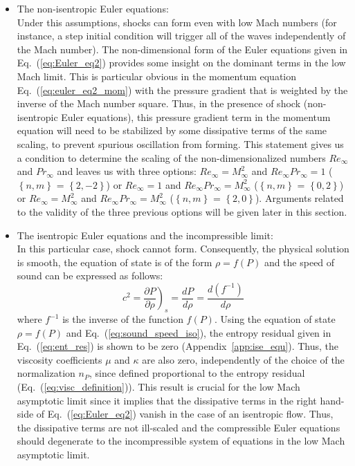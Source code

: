 \documentclass[preprint,10pt]{elsarticle}
\newcommand{\eqt}[1]{Eq.~(\ref{#1})}                     %
\newcommand{\app}[1]{Appendix~\ref{#1}}                   %
\begin{document}
\begin{itemize}
\item The non-isentropic Euler equations:\\
Under this assumptions, shocks can form even with low Mach numbers (for instance, a step initial condition will trigger all of the waves independently of the Mach number). The non-dimensional form of the Euler equations given in \eqt{eq:Euler_eq2} provides some insight on the dominant terms in the low Mach limit. This is particular obvious in the momentum equation \eqt{eq:euler_eq2_mom} with the pressure gradient that is weighted by the inverse of the Mach number square. Thus, in the presence of shock (non-isentropic Euler equations), this pressure gradient term in the momentum equation will need to be stabilized by some dissipative terms of the same scaling, to prevent spurious oscillation from forming. This statement gives us a condition to determine the scaling of the non-dimensionalized numbers $Re_{\infty}$ and $Pr_{\infty}$ and leaves us with three options: $Re_{\infty} = M_{\infty}^2$ and $Re_{\infty}Pr_{\infty} = 1$ ($\left\{ n,m \right\}$ = $\left\{ 2, -2 \right\}$) or $Re_{\infty} = 1$ and $Re_{\infty}Pr_{\infty} = M_{\infty}^2$ ($\left\{ n,m \right\}$ = $\left\{ 0, 2 \right\}$) or $Re_{\infty} = M_{\infty}^2$ and $Re_{\infty}Pr_{\infty} = M_{\infty}^2$ ($\left\{ n,m \right\}$ = $\left\{ 2, 0 \right\}$). Arguments related to the validity of the three previous options will be given later in this section.
\item The isentropic Euler equations and the incompressible limit:\\
In this particular case, shock cannot form. Consequently, the physical solution is smooth, the equation of state is of the form $\rho = f(P)$ and the speed of sound can be expressed as follows: 
\begin{equation}\label{eq:sound_speed_iso}
c^2 = \left. \frac{\partial P}{ \partial \rho}\right)_s = \frac{dP}{d\rho} = \frac{d (f^{-1})}{d \rho} 
\end{equation}
where $f^{-1}$ is the inverse of the function $f(P)$. Using the equation of state $\rho = f(P)$ and \eqt{eq:sound_speed_iso}, the entropy residual given in \eqt{eq:ent_res} is shown to be zero (\app{app:ise_equ}). Thus, the viscosity coefficients $\mu$ and $\kappa$ are also zero, independently of the choice of the normalization $n_P$, since defined proportional to the entropy residual (\eqt{eq:visc_definition}). This result is crucial for the low Mach asymptotic limit since it implies that the dissipative terms in the right hand-side of \eqt{eq:Euler_eq2} vanish in the case of an isentropic flow. Thus, the dissipative terms are not ill-scaled and the compressible Euler equations should degenerate to the incompressible system of equations in the low Mach asymptotic limit.
\end{itemize}
\end{document}
